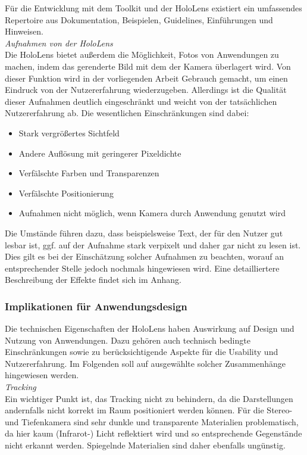 Für die Entwicklung mit dem Toolkit und der HoloLens existiert ein umfassendes Repertoire aus Dokumentation, Beispielen, Guidelines, Einführungen und Hinweisen.\\

\textit{Aufnahmen von der HoloLens}\\
Die HoloLens bietet außerdem die Möglichkeit, Fotos von Anwendungen zu machen, indem das gerenderte Bild mit dem der Kamera überlagert wird. Von dieser Funktion wird in der vorliegenden Arbeit Gebrauch gemacht, um einen Eindruck von der Nutzererfahrung wiederzugeben. Allerdings ist die Qualität dieser Aufnahmen deutlich eingeschränkt und weicht von der tatsächlichen Nutzererfahrung ab. Die wesentlichen Einschränkungen sind dabei: 
\begin{itemize}
	\setlength{\itemsep}{-1pt}
	\singlespacing
	\item Stark vergrößertes Sichtfeld
	\item Andere Auflösung mit geringerer Pixeldichte
	\item Verfälschte Farben und Transparenzen
	\item Verfälschte Positionierung
	\item Aufnahmen nicht möglich, wenn Kamera durch Anwendung genutzt wird
\end{itemize}
Die Umstände führen dazu, dass beispielsweise Text, der für den Nutzer gut lesbar ist, ggf. auf der Aufnahme stark verpixelt und daher gar nicht zu lesen ist. Dies gilt es bei der Einschätzung solcher Aufnahmen zu beachten, worauf an entsprechender Stelle jedoch nochmals hingewiesen wird. Eine detailliertere Beschreibung der Effekte findet sich im Anhang.

\subsubsection{Implikationen für Anwendungsdesign}
\label{sec-2-1-4}
Die technischen Eigenschaften der HoloLens haben Auswirkung auf Design und Nutzung von Anwendungen. Dazu gehören auch technisch bedingte Einschränkungen sowie zu berücksichtigende Aspekte für die Usability und Nutzererfahrung. Im Folgenden soll auf ausgewählte solcher Zusammenhänge hingewiesen werden.\\

\textit{Tracking}\\
Ein wichtiger Punkt ist, das Tracking nicht zu behindern, da die Darstellungen andernfalls nicht korrekt im Raum positioniert werden können. Für die Stereo- und Tiefenkamera sind sehr dunkle und transparente Materialien problematisch, da hier kaum (Infrarot-) Licht reflektiert wird und so entsprechende Gegenstände nicht erkannt werden. Spiegelnde Materialien sind daher ebenfalls ungünstig.\\

